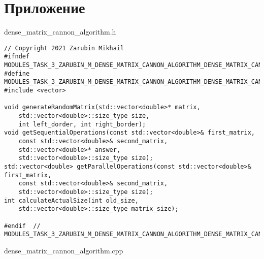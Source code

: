 \documentclass{report}
\begin{document}
\section*{Приложение}

dense\_matrix\_cannon\_algorithm.h
\begin{lstlisting}
// Copyright 2021 Zarubin Mikhail
#ifndef MODULES_TASK_3_ZARUBIN_M_DENSE_MATRIX_CANNON_ALGORITHM_DENSE_MATRIX_CANNON_ALGORITHM_H_
#define MODULES_TASK_3_ZARUBIN_M_DENSE_MATRIX_CANNON_ALGORITHM_DENSE_MATRIX_CANNON_ALGORITHM_H_
#include <vector>

void generateRandomMatrix(std::vector<double>* matrix,
    std::vector<double>::size_type size,
    int left_dorder, int right_border);
void getSequentialOperations(const std::vector<double>& first_matrix,
    const std::vector<double>& second_matrix,
    std::vector<double>* answer,
    std::vector<double>::size_type size);
std::vector<double> getParallelOperations(const std::vector<double>& first_matrix,
    const std::vector<double>& second_matrix,
    std::vector<double>::size_type size);
int calculateActualSize(int old_size,
    std::vector<double>::size_type matrix_size);

#endif  // MODULES_TASK_3_ZARUBIN_M_DENSE_MATRIX_CANNON_ALGORITHM_DENSE_MATRIX_CANNON_ALGORITHM_H_

\end{lstlisting}
dense\_matrix\_cannon\_algorithm.cpp
\end{document}

